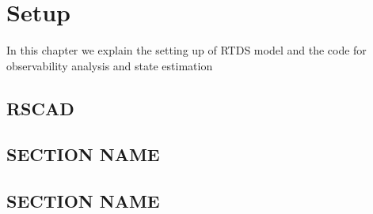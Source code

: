 \chapter{Setup}
In this chapter we explain the setting up of RTDS model and the code for observability analysis and state estimation


\section{RSCAD}


\section{SECTION NAME}
\lipsum[3]

\section{SECTION NAME}
\lipsum[2]